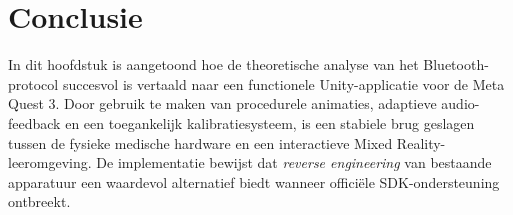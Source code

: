 \section{Conclusie}
In dit hoofdstuk is aangetoond hoe de theoretische analyse van het Bluetooth-protocol succesvol is vertaald naar een 
functionele Unity-applicatie voor de Meta Quest 3. Door gebruik te maken van procedurele animaties, adaptieve audio-feedback en een 
toegankelijk kalibratiesysteem, is een stabiele brug geslagen tussen de fysieke medische hardware en een interactieve Mixed Reality-leeromgeving. De implementatie 
bewijst dat \textit{reverse engineering} van bestaande apparatuur een waardevol alternatief biedt wanneer officiële SDK-ondersteuning ontbreekt.